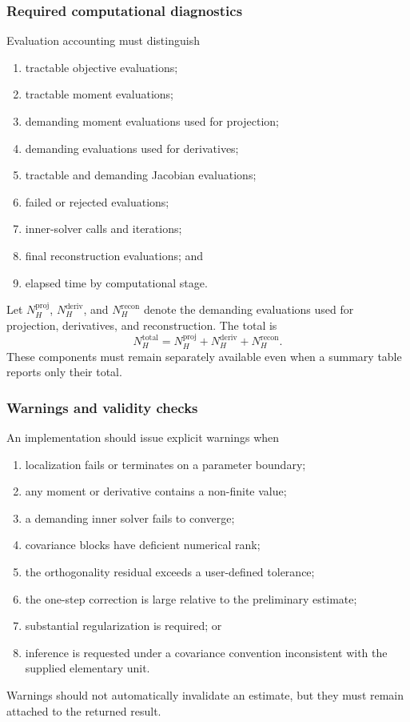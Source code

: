 \subsubsection{Required computational diagnostics}

Evaluation accounting must distinguish
\begin{enumerate}
 \item tractable objective evaluations;
 \item tractable moment evaluations;
 \item demanding moment evaluations used for projection;
 \item demanding evaluations used for derivatives;
 \item tractable and demanding Jacobian evaluations;
 \item failed or rejected evaluations;
 \item inner-solver calls and iterations;
 \item final reconstruction evaluations; and
 \item elapsed time by computational stage.
\end{enumerate}
Let $N_H^{\mathrm{proj}}$, $N_H^{\mathrm{deriv}}$, and
$N_H^{\mathrm{recon}}$ denote the demanding evaluations used for projection,
derivatives, and reconstruction. The total is
\begin{equation}
 N_H^{\mathrm{total}}
 =
 N_H^{\mathrm{proj}}
 +N_H^{\mathrm{deriv}}
 +N_H^{\mathrm{recon}}.
 \label{eq:app_total_demanding_evals}
\end{equation}
These components must remain separately available even when a summary table
reports only their total.

\subsubsection{Warnings and validity checks}

An implementation should issue explicit warnings when
\begin{enumerate}
 \item localization fails or terminates on a parameter boundary;
 \item any moment or derivative contains a non-finite value;
 \item a demanding inner solver fails to converge;
 \item covariance blocks have deficient numerical rank;
 \item the orthogonality residual exceeds a user-defined tolerance;
 \item the one-step correction is large relative to the preliminary estimate;
 \item substantial regularization is required; or
 \item inference is requested under a covariance convention inconsistent with
 the supplied elementary unit.
\end{enumerate}
Warnings should not automatically invalidate an estimate, but they must remain
attached to the returned result.

